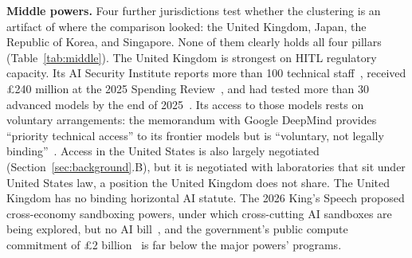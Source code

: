 \documentclass[journal]{IEEEtran}
\begin{document}
\textbf{Middle powers.} Four further jurisdictions test whether the clustering is an artifact of where the comparison looked: the United Kingdom, Japan, the Republic of Korea, and Singapore. None of them clearly holds all four pillars (Table~\ref{tab:middle}). The United Kingdom is strongest on HITL regulatory capacity. Its AI Security Institute reports more than 100 technical staff~\cite{ukaisi2026}, received \pounds240 million at the 2025 Spending Review~\cite{ukaiopp2026oneyear}, and had tested more than 30 advanced models by the end of 2025~\cite{ukaisi2025review}. Its access to those models rests on voluntary arrangements: the memorandum with Google DeepMind provides ``priority technical access'' to its frontier models but is ``voluntary, not legally binding''~\cite{ukgdmmou2025}. Access in the United States is also largely negotiated (Section~\ref{sec:background}.B), but it is negotiated with laboratories that sit under United States law, a position the United Kingdom does not share. The United Kingdom has no binding horizontal AI statute. The 2026 King's Speech proposed cross-economy sandboxing powers, under which cross-cutting AI sandboxes are being explored, but no AI bill~\cite{ukkingsspeech2026,lewissilkin2026ukaibill}, and the government's public compute commitment of \pounds2 billion~\cite{ukaiopp2026oneyear} is far below the major powers' programs.
\end{document}
